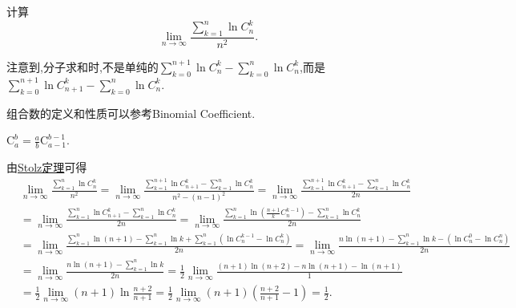 \documentclass[../../main.tex]{subfiles}%
\begin{document}
\begin{example}
计算
\[
\lim_{n \to \infty} \frac{\sum\limits_{k = 1}^{n} \ln C_{n}^{k}}{n^2}.
\]
\end{example}
\begin{note}
注意到,分子求和时,不是单纯的\(\sum\limits_{k = 0}^{n + 1} \ln C_{n}^{k} - \sum\limits_{k = 0}^{n} \ln C_{n}^{k}\),而是\(\sum\limits_{k = 0}^{n + 1} \ln C_{n + 1}^{k} - \sum\limits_{k = 0}^{n} \ln C_{n}^{k}\).

组合数的定义和性质可以参考Binomial Coefficient.
\end{note}
\begin{conclusion}
$\mathrm{C}_{a}^{b}=\frac{a}{b}\mathrm{C}_{a-1}^{b-1}$.
\end{conclusion}
\begin{solution}

由\hyperref[theorem:Stolz定理]{Stolz定理}可得\begin{align*}
&\lim_{n\rightarrow \infty} \frac{\sum\limits_{k=1}^n{\ln C_{n}^{k}}}{n^2}=\lim_{n\rightarrow \infty} \frac{\sum\limits_{k=1}^{n+1}{\ln C_{n+1}^{k}}-\sum\limits_{k=1}^n{\ln C_{n}^{k}}}{n^2-\left( n-1 \right) ^2}=\lim_{n\rightarrow \infty} \frac{\sum\limits_{k=1}^{n+1}{\ln C_{n+1}^{k}}-\sum\limits_{k=1}^n{\ln C_{n}^{k}}}{2n}
\\
&=\lim_{n\rightarrow \infty} \frac{\sum\limits_{k=1}^n{\ln C_{n+1}^{k}}-\sum\limits_{k=1}^n{\ln C_{n}^{k}}}{2n}=\lim_{n\rightarrow \infty} \frac{\sum\limits_{k=1}^{n\,\,}{\ln \left( \frac{n+1}{k}C_{n}^{k-1} \right)}-\sum\limits_{k=1}^n{\ln C_{n}^{k}}}{2n}
\\
&=\lim_{n\rightarrow \infty} \frac{\sum\limits_{k=1}^{n\,\,}{\ln \left( n+1 \right)}-\sum\limits_{k=1}^{n\,\,}{\ln k}+\sum\limits_{k=1}^n{\left( \ln C_{n}^{k-1}-\ln C_{n}^{k} \right)}}{2n}=\lim_{n\rightarrow \infty} \frac{n\ln \left( n+1 \right) -\sum\limits_{k=1}^{n\,\,}{\ln k}-\left( \ln C_{n}^{0}-\ln C_{n}^{n} \right)}{2n}
\\
&=\lim_{n\rightarrow \infty} \frac{n\ln \left( n+1 \right) -\sum\limits_{k=1}^{n\,\,}{\ln k}}{2n}=\frac{1}{2}\lim_{n\rightarrow \infty} \frac{\left( n+1 \right) \ln \left( n+2 \right) -n\ln \left( n+1 \right) -\ln \left( n+1 \right)}{1}
\\
&=\frac{1}{2}\lim_{n\rightarrow \infty} \left( n+1 \right) \ln \frac{n+2}{n+1}=\frac{1}{2}\lim_{n\rightarrow \infty} \left( n+1 \right) \left( \frac{n+2}{n+1}-1 \right) =\frac{1}{2}.
\end{align*}

\end{solution}
\end{document}
